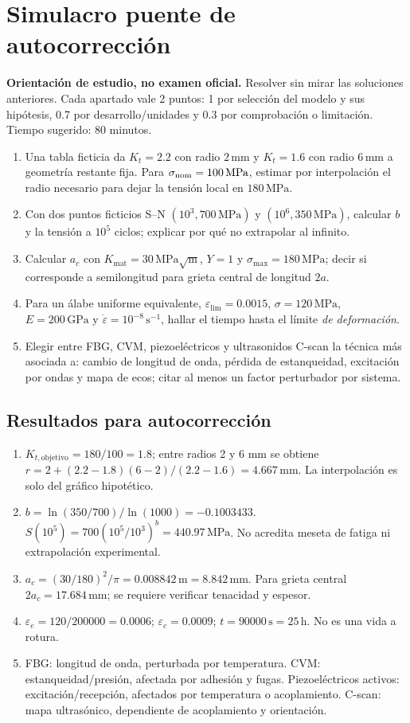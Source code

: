 \chapter{Simulacro puente de autocorrección}
\label{ch:simulacro-puente}
\noindent\textbf{Orientación de estudio, no examen oficial.} Resolver sin mirar las soluciones anteriores. Cada apartado vale 2 puntos: 1 por selección del modelo y sus hipótesis, 0.7 por desarrollo/unidades y 0.3 por comprobación o limitación. Tiempo sugerido: 80 minutos.
\begin{enumerate}
\item Una tabla ficticia da $K_t=2.2$ con radio $2\,\mathrm{mm}$ y $K_t=1.6$ con radio $6\,\mathrm{mm}$ a geometría restante fija. Para $\sigma_{\rm nom}=100\,\mathrm{MPa}$, estimar por interpolación el radio necesario para dejar la tensión local en $180\,\mathrm{MPa}$.
\item Con dos puntos ficticios S--N $(10^3,700\,\mathrm{MPa})$ y $(10^6,350\,\mathrm{MPa})$, calcular $b$ y la tensión a $10^5$ ciclos; explicar por qué no extrapolar al infinito.
\item Calcular $a_c$ con $K_{\mathrm{mat}}=30\,\mathrm{MPa}\sqrt{\mathrm m}$, $Y=1$ y $\sigma_{\max}=180\,\mathrm{MPa}$; decir si corresponde a semilongitud para grieta central de longitud $2a$.
\item Para un álabe uniforme equivalente, $\varepsilon_{\lim}=0.0015$, $\sigma=120\,\mathrm{MPa}$, $E=200\,\mathrm{GPa}$ y $\dot\varepsilon=10^{-8}\,\mathrm{s^{-1}}$, hallar el tiempo hasta el límite \emph{de deformación}.
\item Elegir entre FBG, CVM, piezoeléctricos y ultrasonidos C-scan la técnica más asociada a: cambio de longitud de onda, pérdida de estanqueidad, excitación por ondas y mapa de ecos; citar al menos un factor perturbador por sistema.
\end{enumerate}
\section*{Resultados para autocorrección}
\begin{enumerate}
\item $K_{t,\mathrm{objetivo}}=180/100=1.8$; entre radios 2 y 6 mm se obtiene $r=2+(2.2-1.8)(6-2)/(2.2-1.6)=4.667\,\mathrm{mm}$. La interpolación es solo del gráfico hipotético.
\item $b=\ln(350/700)/\ln(1000)=-0.1003433$. $S(10^5)=700(10^5/10^3)^b=440.97\,\mathrm{MPa}$. No acredita meseta de fatiga ni extrapolación experimental.
\item $a_c=(30/180)^2/\pi=0.008842\,\mathrm m=8.842\,\mathrm{mm}$. Para grieta central $2a_c=17.684\,\mathrm{mm}$; se requiere verificar tenacidad y espesor.
\item $\varepsilon_e=120/200000=0.0006$; $\varepsilon_c=0.0009$; $t=90000\,\mathrm s=25\,\mathrm h$. No es una vida a rotura.
\item FBG: longitud de onda, perturbada por temperatura. CVM: estanqueidad/presión, afectada por adhesión y fugas. Piezoeléctricos activos: excitación/recepción, afectados por temperatura o acoplamiento. C-scan: mapa ultrasónico, dependiente de acoplamiento y orientación.
\end{enumerate}
